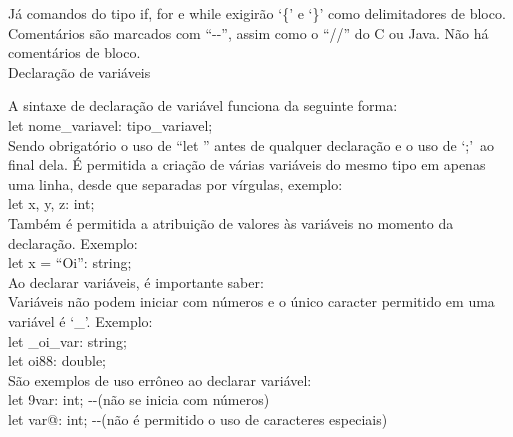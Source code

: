 \documentclass[12pt,a4paper]{article}
\begin{document}



Já comandos do tipo if, for e while exigirão `\{' e `\}' como delimitadores de bloco.
Comentários são marcados com ``-{}-'', assim como o ``//'' do C ou Java. Não há comentários de bloco.\\

\hypertarget{label}{\Large{Declaração de variáveis}}\\[0.3cm]
\normalsize

A sintaxe de declaração de variável funciona da seguinte forma:\\

let nome\_variavel: tipo\_variavel;\\

Sendo obrigatório o uso de ``let '' antes de qualquer declaração e o uso de `;'\ ao final dela. É permitida a criação de várias variáveis do mesmo tipo em apenas uma linha, desde que separadas por vírgulas, exemplo:\\

let x, y, z: int;\\

Também é permitida a atribuição de valores às variáveis no momento da declaração. Exemplo:\\

let x = ``Oi'': string;\\

Ao declarar variáveis, é importante saber: \\

Variáveis não podem iniciar com números e o único caracter permitido em uma variável é `\_'. Exemplo: \\

let \_oi\_var: string;\\

let oi88: double;\\

São exemplos de uso errôneo ao declarar variável:\\

let 9var: int; -{}-(não se inicia com números)\\

let var@: int; -{}-(não é permitido o uso de caracteres especiais)\\
\end{document}
